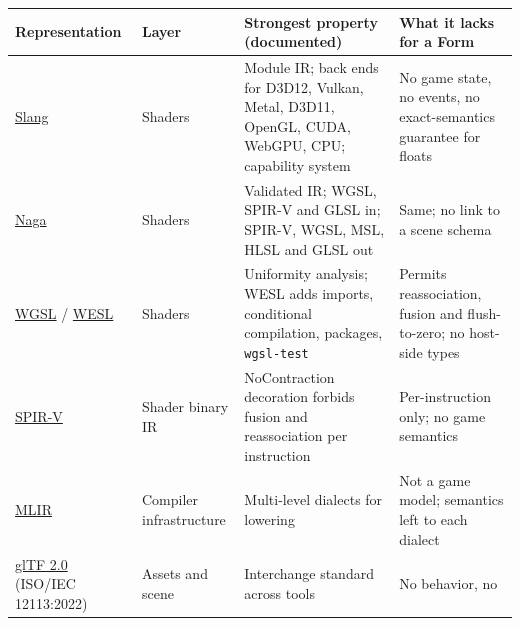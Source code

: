 \documentclass[10pt,letterpaper]{article}
\begin{document}
{\footnotesize\setlength{\tabcolsep}{3.8pt}\renewcommand{\arraystretch}{1.15}
\begin{longtable}[]{@{}
  >{\raggedright\arraybackslash}p{}
  >{\raggedright\arraybackslash}p{}
  >{\raggedright\arraybackslash}p{}
  >{\raggedright\arraybackslash}p{}@{}}
\toprule\noalign{}
\begin{minipage}[b]{\linewidth}\raggedright
\textbf{Representation}
\end{minipage} & \begin{minipage}[b]{\linewidth}\raggedright
\textbf{Layer}
\end{minipage} & \begin{minipage}[b]{\linewidth}\raggedright
\textbf{Strongest property (documented)}
\end{minipage} & \begin{minipage}[b]{\linewidth}\raggedright
\textbf{What it lacks for a Form}
\end{minipage} \\
\midrule\noalign{}
\endhead
\bottomrule\noalign{}
\endlastfoot
\href{https://shader-slang.org/}{Slang} & Shaders & Module IR; back ends
for D3D12, Vulkan, Metal, D3D11, OpenGL, CUDA, WebGPU, CPU; capability
system & No game state, no events, no exact-semantics guarantee for
floats \\
\href{https://github.com/gfx-rs/wgpu/tree/trunk/naga}{Naga} & Shaders &
Validated IR; WGSL, SPIR-V and GLSL in; SPIR-V, WGSL, MSL, HLSL and GLSL
out & Same; no link to a scene schema \\
\href{https://www.w3.org/TR/WGSL/}{WGSL} /
\href{https://wesl-lang.dev/}{WESL} & Shaders & Uniformity analysis;
WESL adds imports, conditional compilation, packages, \texttt{wgsl-test}
& Permits reassociation, fusion and flush-to-zero; no host-side types \\
\href{https://registry.khronos.org/SPIR-V/specs/unified1/SPIRV.html}{SPIR-V}
& Shader binary IR & NoContraction decoration forbids fusion and
reassociation per instruction & Per-instruction only; no game
semantics \\
\href{https://mlir.llvm.org/}{MLIR} & Compiler infrastructure &
Multi-level dialects for lowering & Not a game model; semantics left to
each dialect \\
\href{https://www.khronos.org/gltf/}{glTF 2.0} (ISO/IEC 12113:2022) &
Assets and scene & Interchange standard across tools & No behavior, no

\end{longtable}}
\end{document}
